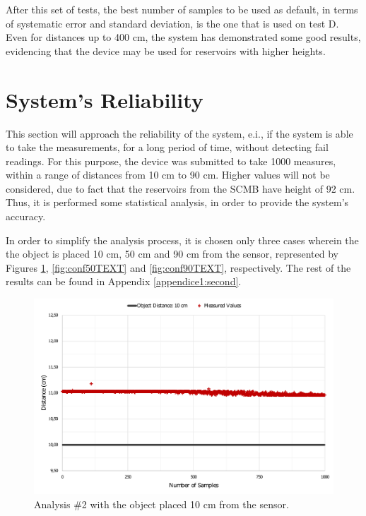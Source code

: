 After this set of tests, the best number of samples to be used as default, in terms of systematic error and standard deviation, is the one that is used on test D. Even for distances up to 400 cm, the system has demonstrated some good results, evidencing that the device may be used for reservoirs with higher heights.


\section{System's Reliability}\label{section:systemReliability}

This section will approach the reliability of the system, e.i., if the system is able to take the measurements, for a long period of time, without detecting fail readings. For this purpose, the device was submitted to take 1000 measures, within a range of distances from 10 cm to 90 cm. Higher values will not be considered, due to fact that the reservoirs from the \gls{SCMB} have height of 92 cm. Thus, it is performed some statistical analysis, in order to provide the system's accuracy.

In order to simplify the analysis process, it is chosen only three cases wherein the the object is placed 10 cm, 50 cm and 90 cm from the sensor, represented by Figures \ref{fig:conf10TEXT}, \ref{fig:conf50TEXT} and \ref{fig:conf90TEXT}, respectively. The rest of the results can be found in Appendix \ref{appendice1:second}. 

\begin{figure}[h!]
    \centering
    \includegraphics[scale=0.5]{images/Results/testing_methodology/conf10.pdf}
    \caption{Analysis \#2 with the object placed 10 cm from the sensor.}
    \label{fig:conf10TEXT}
\end{figure}

